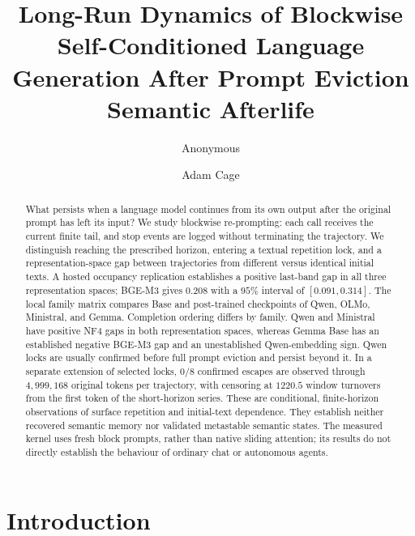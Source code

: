 \documentclass[10pt]{article}
\title{Long-Run Dynamics of Blockwise Self-Conditioned Language Generation After Prompt Eviction\\
\large Semantic Afterlife}
\author{Anonymous}
\author{Adam Cage}
\date{}
\begin{document}
\maketitle

\begin{abstract}
What persists when a language model continues from its own output after
the original prompt has left its input? We study blockwise re-prompting:
each call receives the current finite tail, and stop events are logged
without terminating the trajectory. We distinguish reaching the
prescribed horizon, entering a textual repetition lock, and a
representation-space gap between trajectories from different versus
identical initial texts. A hosted occupancy replication establishes a
positive last-band gap in all three representation spaces; BGE-M3 gives
$0.208$ with a $95\%$ interval of $[0.091, 0.314]$. %
The local family matrix compares Base and post-trained checkpoints of
Qwen, OLMo, Ministral, and Gemma. Completion ordering differs by family.
Qwen and Ministral have positive NF4 gaps in both representation spaces,
whereas Gemma Base has an established negative BGE-M3 gap and an
unestablished Qwen-embedding sign. %
Qwen locks are usually confirmed before full prompt eviction and persist
beyond it. In a separate extension of selected locks, $0/8$ confirmed
escapes are observed through $4{,}999{,}168$ original tokens per
trajectory, with censoring at $1220.5$ window turnovers from the first
token of the short-horizon series. %
These are conditional, finite-horizon observations of surface repetition
and initial-text dependence. They establish neither recovered semantic
memory nor validated metastable semantic states. The measured kernel
uses fresh block prompts, rather than native sliding attention; its
results do not directly establish the behaviour of ordinary chat or
autonomous agents.
\end{abstract}

\section{Introduction}
\label{sec:intro}
\end{document}
